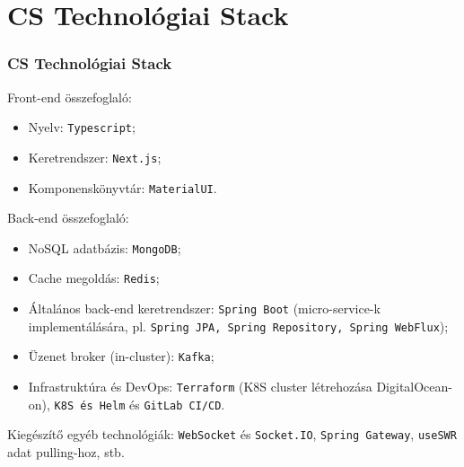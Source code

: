 \section{CS Technológiai Stack}

\begin{frame}
    \frametitle{CS Technológiai Stack}

    Front-end összefoglaló:
    \begin{itemize}
        \item Nyelv: \texttt{Typescript};
        \item Keretrendszer: \texttt{Next.js};
        \item Komponenskönyvtár: \texttt{MaterialUI}.
    \end{itemize}

    \medbreak

    Back-end összefoglaló:
    \begin{itemize}
        \item NoSQL adatbázis: \texttt{MongoDB};
        \item Cache megoldás: \texttt{Redis};
        \item Általános back-end keretrendszer: \texttt{Spring Boot} (micro-service-k implementálására, pl. \texttt{Spring JPA, Spring Repository, Spring WebFlux});
        \item Üzenet broker (in-cluster): \texttt{Kafka};
        \item Infrastruktúra és DevOps: \texttt{Terraform} (K8S cluster létrehozása DigitalOcean-on), \texttt{K8S és Helm} és \texttt{GitLab CI/CD}.
    \end{itemize}

    \medbreak

    Kiegészítő egyéb technológiák: \texttt{WebSocket} és \texttt{Socket.IO}, \texttt{Spring Gateway}, \texttt{useSWR} adat pulling-hoz, stb.

\end{frame}